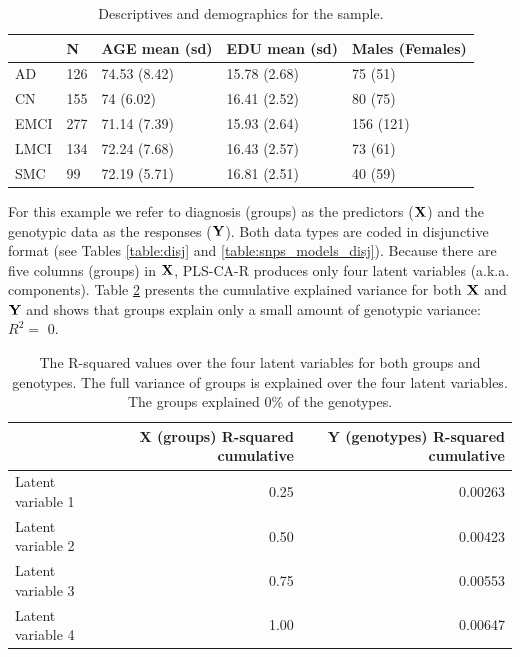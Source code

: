 \documentclass[12pt]{article}
\begin{document}
\begin{table}[!h]

\caption{\label{tab:sample_descriptives}\label{table:desctab} Descriptives and demographics for the sample.}
\centering
\begin{tabular}{lllll}
\toprule
  & N & AGE mean (sd) & EDU mean (sd) & Males (Females)\\
\midrule
AD & 126 & 74.53 (8.42) & 15.78 (2.68) & 75 (51)\\
CN & 155 & 74 (6.02) & 16.41 (2.52) & 80 (75)\\
EMCI & 277 & 71.14 (7.39) & 15.93 (2.64) & 156 (121)\\
LMCI & 134 & 72.24 (7.68) & 16.43 (2.57) & 73 (61)\\
SMC & 99 & 72.19 (5.71) & 16.81 (2.51) & 40 (59)\\
\bottomrule
\end{tabular}
\end{table}

For this example we refer to diagnosis (groups) as the predictors
(\({\bf X}\)) and the genotypic data as the responses (\({\bf Y}\)).
Both data types are coded in disjunctive format (see Tables
\ref{table:disj} and \ref{table:snps_models_disj}). Because there are
five columns (groups) in \({\bf X}\), PLS-CA-R produces only four latent
variables (a.k.a. components). Table \ref{table:r2ex1} presents the
cumulative explained variance for both \({\bf X}\) and \({\bf Y}\) and
shows that groups explain only a small amount of genotypic variance:
\(R^2=\) 0.

\begin{table}[!h]

\caption{\label{tab:unnamed-chunk-3}\label{table:r2ex1} The R-squared values over the four latent variables for both groups and genotypes. The full variance of groups is explained over the four latent variables. The groups explained 0\% of the genotypes.}
\centering
\begin{tabular}{lrr}
\toprule
  & X (groups) R-squared cumulative & Y (genotypes) R-squared cumulative\\
\midrule
Latent variable 1 & 0.25 & 0.00263\\
Latent variable 2 & 0.50 & 0.00423\\
Latent variable 3 & 0.75 & 0.00553\\
Latent variable 4 & 1.00 & 0.00647\\
\bottomrule
\end{tabular}
\end{table}
\end{document}
